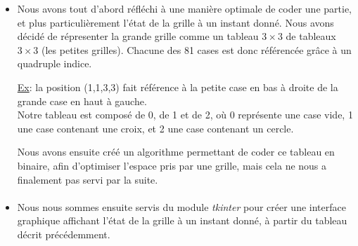 \documentclass[10pt, french]{article}
\begin{document}
\begin{itemize}
    \item Nous avons tout d'abord réfléchi à une manière optimale de coder une partie, et plus particulièrement l'état de la grille à un instant donné. Nous avons décidé de répresenter  la grande grille comme un tableau $3\times3$ de tableaux $3\times3$ (les petites grilles). Chacune des 81 cases est donc référencée grâce à un quadruple indice. \\
    \par \underline{Ex}: la position (1,1,3,3) fait référence à la petite case en bas à droite de la grande case en haut à gauche. \\ 
    Notre tableau est composé de 0, de 1 et de 2, où 0 représente une case vide, 1 une case contenant une croix, et 2 une case contenant un cercle. \\
    \par Nous avons ensuite créé un algorithme permettant de coder ce tableau en binaire, afin d'optimiser l'espace pris par une grille, mais cela ne nous a finalement pas servi par la suite.
   \paragraph{}
    \item Nous nous sommes ensuite servis du module \textit{tkinter} pour créer une interface graphique affichant l'état de la grille à un instant donné, à partir du tableau décrit précédemment. 

\end{itemize}
\end{document}

